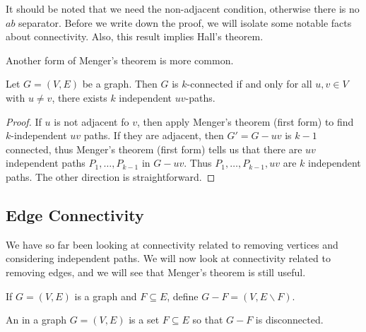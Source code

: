 \begin{remark}
	It should be noted that we need the non-adjacent condition, otherwise there is no $ab$ separator. Before we write down the proof, we will isolate some notable facts about connectivity.
	Also, this result implies Hall's theorem.
\end{remark}

Another form of Menger's theorem is more common.

\begin{theorem}
	Let $G = (V, E)$ be a graph. Then $G$ is $k$-connected if and only for all $u, v \in V$ with $u \neq v$, there exists $k$ independent $uv$-paths.
\end{theorem}
\begin{proof}
	If $u$ is not adjacent fo $v$, then apply Menger's theorem (first form) to find $k$-independent $uv$ paths. If they are adjacent, then $G' = G - uv$ is $k - 1$ connected, thus Menger's theorem (first form) tells us that there are $uv$ independent paths $P_1, \dots, P_{k - 1}$ in $G - uv$. Thus $P_1, \dots, P_{k - 1}, uv$ are $k$ independent paths. The other direction is straightforward. 
\end{proof}

\subsection{Edge Connectivity}

We have so far been looking at connectivity related to removing vertices and considering independent paths. We will now look at connectivity related to removing edges, and we will see that Menger's theorem is still useful.

\begin{notation}
	If $G = (V, E)$ is a graph and $F \subseteq E$, define $G - F = (V, E \backslash F)$.
\end{notation}

\begin{definition}
	An  in a graph $G = (V, E)$ is a set $F \subseteq E$ so that $G - F$ is disconnected.
\end{definition}

